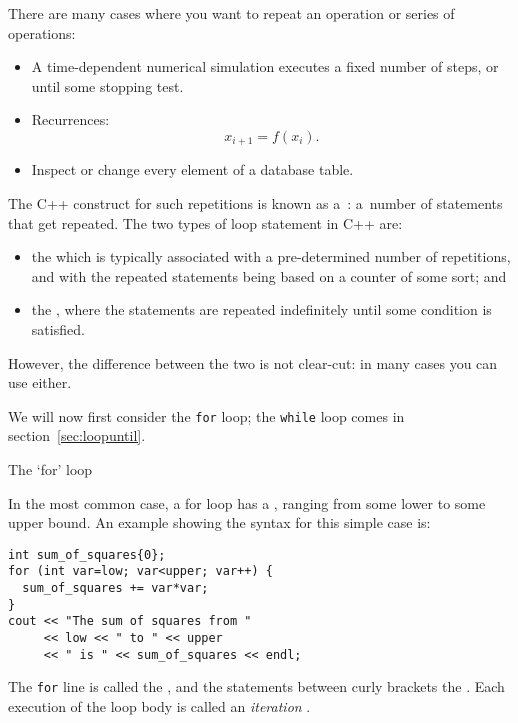
There are many cases where you want to repeat an operation or series
of operations:
\begin{itemize}
\item A time-dependent numerical simulation executes a fixed number of
  steps, or until some stopping test.
\item Recurrences: \[ x_{i+1} = f(x_i). \]
\item Inspect or change every element of a database table.
\end{itemize}


The C++ construct for such repetitions
is known as a~: a~number of
statements that get repeated. The two types of loop statement in C++ are:
\begin{itemize}
\item the  which is typically associated with
  a pre-determined number of repetitions, and with the repeated
  statements being based on a counter of some sort; and
\item the , where the statements are
  repeated indefinitely until some condition is satisfied.
\end{itemize}
However, the difference between the two is not clear-cut: in many
cases you can use either.

We will now first consider the \lstinline{for} loop; the \lstinline{while} loop comes in
section~\ref{sec:loopuntil}.

 {The `for' loop}
\label{sec:for}

In the most common case, a for loop has a
, ranging from some lower to some upper
bound. An example showing the syntax for this simple case is:
\begin{lstlisting}
int sum_of_squares{0};
for (int var=low; var<upper; var++) {
  sum_of_squares += var*var;
}
cout << "The sum of squares from "
     << low << " to " << upper
     << " is " << sum_of_squares << endl;
\end{lstlisting}
The \lstinline{for} line is called the , and the
statements between curly brackets the .
Each execution of the loop body is called an
%
\emph{iteration}%
%
%
.

